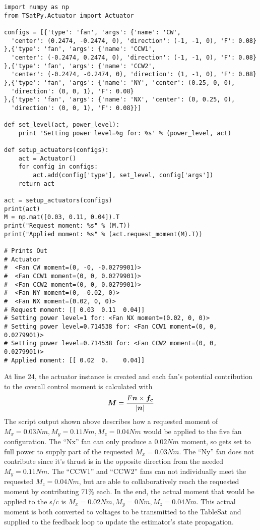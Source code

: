 \begin{singlespace}
  \begin{verbatim}
import numpy as np
from TSatPy.Actuator import Actuator

configs = [{'type': 'fan', 'args': {'name': 'CW',
  'center': (0.2474, -0.2474, 0), 'direction': (-1, -1, 0), 'F': 0.08}
},{'type': 'fan', 'args': {'name': 'CCW1',
  'center': (-0.2474, 0.2474, 0), 'direction': (-1, -1, 0), 'F': 0.08}
},{'type': 'fan', 'args': {'name': 'CCW2',
  'center': (-0.2474, -0.2474, 0), 'direction': (1, -1, 0), 'F': 0.08}
},{'type': 'fan', 'args': {'name': 'NY', 'center': (0.25, 0, 0),
  'direction': (0, 0, 1), 'F': 0.08}
},{'type': 'fan', 'args': {'name': 'NX', 'center': (0, 0.25, 0),
  'direction': (0, 0, 1), 'F': 0.08}}]

def set_level(act, power_level):
    print 'Setting power level=%g for: %s' % (power_level, act)

def setup_actuators(configs):
    act = Actuator()
    for config in configs:
        act.add(config['type'], set_level, config['args'])
    return act

act = setup_actuators(configs)
print(act)
M = np.mat([0.03, 0.11, 0.04]).T
print("Request moment: %s" % (M.T))
print("Applied moment: %s" % (act.request_moment(M).T))

# Prints Out
# Actuator
#  <Fan CW moment=(0, -0, -0.0279901)>
#  <Fan CCW1 moment=(0, 0, 0.0279901)>
#  <Fan CCW2 moment=(0, 0, 0.0279901)>
#  <Fan NY moment=(0, -0.02, 0)>
#  <Fan NX moment=(0.02, 0, 0)>
# Request moment: [[ 0.03  0.11  0.04]]
# Setting power level=1 for: <Fan NX moment=(0.02, 0, 0)>
# Setting power level=0.714538 for: <Fan CCW1 moment=(0, 0, 0.0279901)>
# Setting power level=0.714538 for: <Fan CCW2 moment=(0, 0, 0.0279901)>
# Applied moment: [[ 0.02  0.    0.04]]
  \end{verbatim}
\nocite{minted}
\end{singlespace}

At line 24, the actuator instance is created and each fan's potential contribution to the overall control moment is calculated with
\begin{equation}
  \boldsymbol{M} = \frac{F \boldsymbol{n} \times \boldsymbol{f_c}}{|\boldsymbol{n}|}
\end{equation}
The script output shown above describes how a requested moment of $M_x = 0.03Nm, M_y = 0.11Nm, M_z = 0.04Nm$ would be applied to the five fan configuration.  The ``Nx'' fan can only produce a $0.02Nm$ moment, so gets set to full power to supply part of the requested $M_x = 0.03Nm$.  The ``Ny'' fan does not contribute since it's thrust is in the opposite direction from the needed $M_y = 0.11Nm$.  The ``CCW1'' and ``CCW2'' fans can not individually meet the requested $M_z = 0.04Nm$, but are able to collaboratively reach the requested moment by contributing 71\% each.  In the end, the actual moment that would be applied to the s/c is $M_x = 0.02Nm, M_y = 0Nm, M_z = 0.04Nm$.  This actual moment is both converted to voltages to be transmitted to the TableSat and supplied to the feedback loop to update the estimator's state propagation.

